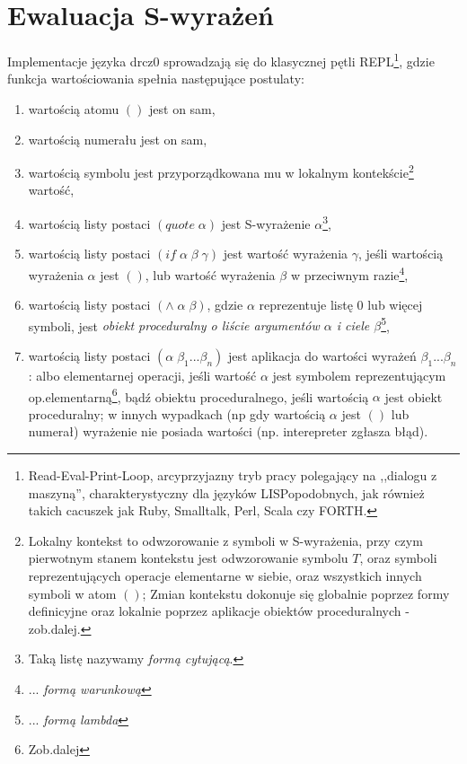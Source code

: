 \documentclass[a4paper]{article}
\begin{document}
\section{Ewaluacja S-wyrażeń}

Implementacje języka drcz0 sprowadzają się do klasycznej pętli REPL\footnote{Read-Eval-Print-Loop, arcyprzyjazny
tryb pracy polegający na ,,dialogu z maszyną'', charakterystyczny dla języków LISPopodobnych, jak również
takich cacuszek jak Ruby, Smalltalk, Perl, Scala czy FORTH.}, gdzie funkcja wartościowania spełnia następujące
postulaty:

\begin{enumerate}
\item wartością atomu $()$ jest on sam,
\item wartością numerału jest on sam,
\item wartością symbolu jest przyporządkowana mu w lokalnym kontekście\footnote{Lokalny kontekst to 
odwzorowanie z symboli w S-wyrażenia, przy czym pierwotnym stanem kontekstu jest odwzorowanie symbolu $T$,
oraz symboli reprezentujących operacje elementarne w siebie, oraz wszystkich innych symboli w atom $()$;
Zmian kontekstu dokonuje się globalnie poprzez formy definicyjne oraz lokalnie poprzez aplikacje obiektów
proceduralnych - zob.dalej.} wartość,
\item wartością listy postaci $(quote \; \alpha)$ jest S-wyrażenie $\alpha$\footnote{Taką listę nazywamy
\emph{formą cytującą}.},
\item wartością listy postaci $(if \; \alpha \; \beta \; \gamma)$ jest wartość wyrażenia $\gamma$, jeśli wartością
wyrażenia $\alpha$ jest $()$, lub wartość wyrażenia $\beta$ w przeciwnym razie\footnote{... \emph{formą warunkową}},
\item wartością listy postaci $(\wedge \; \alpha \; \beta)$, gdzie $\alpha$ reprezentuje listę $0$ lub więcej symboli,
jest \emph{obiekt proceduralny o liście argumentów $\alpha$ i ciele $\beta$}\footnote{... \emph{formą lambda}},
\item wartością listy postaci $(\alpha \; \beta_1 ... \beta_n)$ jest aplikacja do wartości wyrażeń
$\beta_1 ... \beta_n$: albo elementarnej operacji, jeśli wartość $\alpha$ jest symbolem reprezentującym
op.elementarną\footnote{Zob.dalej}, bądź obiektu proceduralnego, jeśli wartością $\alpha$ jest obiekt
proceduralny; w innych wypadkach (np gdy wartością $\alpha$ jest $()$ lub numerał) wyrażenie nie posiada
wartości (np. interepreter zgłasza błąd).
\end{enumerate}
\end{document}
